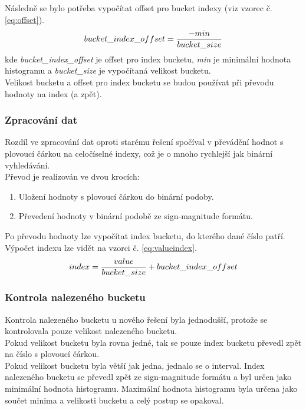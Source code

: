 \documentclass[12pt, a4paper]{article}
\begin{document}
\noindent Následně se bylo potřeba vypočítat offset pro bucket indexy (viz vzorec č. \ref{eq:offset}).
\begin{equation}
bucket\_index\_offset = \frac{-min}{bucket\_size}  \\
\label{eq:offset} 
\end{equation}
kde \textit{bucket\_index\_offset} je offset pro index bucketu, \textit{min} je minimální hodnota histogramu a \textit{bucket\_size} je vypočítaná velikost bucketu. \\


\noindent Velikost bucketu a offset pro index bucketu se budou používat při převodu hodnoty na index (a zpět).

\subsubsection{Zpracování dat} \label{sssec:new_zpracovani}
Rozdíl ve zpracování dat oproti starému řešení spočíval v převádění hodnot s plovoucí čárkou na celočíselné indexy, což je o mnoho rychlejší jak binární vyhledávání. \\
Převod je realizován ve dvou krocích:
\begin{enumerate}
\item Uložení hodnoty s plovoucí čárkou do binární podoby.
\item Převedení hodnoty v binární podobě ze sign-magnitude formátu.\\
\end{enumerate}

\noindent Po převodu hodnoty lze vypočítat index bucketu, do kterého dané číslo patří. Výpočet indexu lze vidět na vzorci č. \ref{eq:valueindex}.
\begin{equation}
index = \frac{value}{bucket\_size} + bucket\_index\_offset  \\
\label{eq:valueindex} 
\end{equation}


\subsubsection{Kontrola nalezeného bucketu}
Kontrola nalezeného bucketu u nového řešení byla jednodušší, protože se kontrolovala pouze velikost nalezeného bucketu. \\
\indent Pokud velikost bucketu byla rovna jedné, tak se pouze index bucketu převedl zpět na číslo s plovoucí čárkou.\\
\indent Pokud velikost bucketu byla větší jak jedna, jednalo se o interval. Index nalezeného bucketu se převedl zpět ze sign-magnitude formátu a byl určen jako minimální hodnota histogramu. Maximální hodnota histogramu byla určena jako součet minima a velikosti bucketu a celý postup se opakoval.
\end{document}
